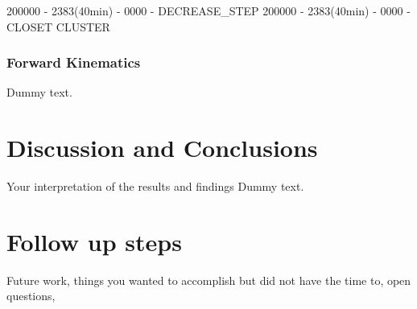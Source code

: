 \documentclass{article}
\begin{document}
200000 - 2383(40min) - 0000 - DECREASE_STEP
200000 - 2383(40min) - 0000 - CLOSET CLUSTER


\begin{frame}
\frametitle{Forward Kinematics}

\begin{center}
\end{center}
\end{frame}
Dummy text.

\section{Discussion and Conclusions}
Your interpretation of the results and findings
Dummy text. 


\section{Follow up steps}

Future work, things you wanted to accomplish but did not have the time to, open questions,

  






\end{document}
